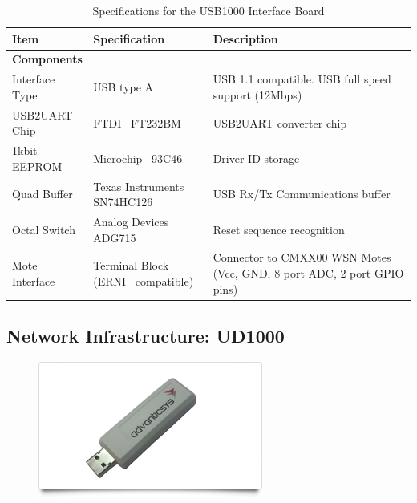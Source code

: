 \begin{table}[H]
	\centering
	\begin{tabular}{| l | l | p{5.5cm} |}
	\hline
	\textbf{Item} & \textbf{Specification} & \textbf{Description} \\
	\hline
	\hline

	\multicolumn{3}{|l|}{\textbf{Components}} \\
	\hline
	Interface Type & USB type A & USB 1.1 compatible. USB full speed support (12Mbps)\\
	\hline
	USB2UART Chip & FTDI\textregistered~ FT232BM & USB2UART converter chip\\
	\hline
	1kbit EEPROM & Microchip\textregistered~ 93C46 & Driver ID storage\\
	\hline
	Quad Buffer & Texas Instruments\textregistered~ SN74HC126 & USB Rx/Tx Communications buffer\\
	\hline
	Octal Switch & Analog Devices\textregistered~ ADG715 & Reset sequence recognition\\
	\hline
	Mote Interface & Terminal Block (ERNI\textregistered~ compatible) & Connector to CMXX00 WSN Motes (Vcc, GND, 8 port ADC, 2 port GPIO pins)\\
	\hline

	\end{tabular}
	\caption{Specifications for the USB1000 Interface Board \cite{USB1000}}
	\label{tab:USB1000-spec}
\end{table}

\clearpage

\subsection{Network Infrastructure: UD1000}

\begin{figure}[H]
\centering
\includegraphics[scale=0.5]{Images/UD1000}
\end{figure}

